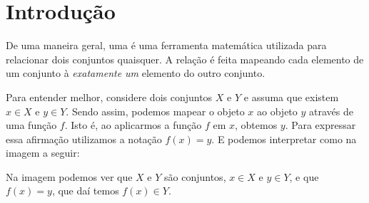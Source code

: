 \section{Introdução}

De uma maneira geral, uma  é uma ferramenta matemática utilizada para relacionar dois conjuntos quaisquer. A relação é feita mapeando cada elemento de um conjunto à \emph{exatamente um} elemento do outro conjunto.

\begin{example}
Para entender melhor, considere dois conjuntos $X$ e $Y$ e assuma que existem $x \in X$ e $y \in Y$. Sendo assim, podemos mapear o objeto $x$ ao objeto $y$ através de uma função $f$. Isto é, ao aplicarmos a função $f$ em $x$, obtemos $y$. Para expressar essa afirmação utilizamos a notação $f(x) = y$. E podemos interpretar como na imagem a seguir:

\begin{center}
     
\end{center}
\end{example}

Na imagem podemos ver que $X$ e $Y$ são conjuntos, $x \in X$ e $y \in Y$, e que $f(x) = y$, que daí temos $f(x) \in Y$.